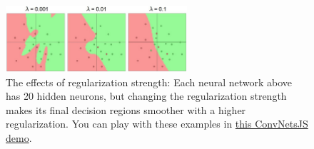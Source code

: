 \begin{figure}[h]
  \centering
  \includegraphics[width=0.6\textwidth]{Images/nn/4.jpeg}
  \caption{The effects of regularization strength: Each neural network above has 20 hidden neurons, but changing the regularization strength makes its final decision regions smoother with a higher regularization. You can play with these examples in \href{http://cs.stanford.edu/people/karpathy/convnetjs/demo/classify2d.html}{this ConvNetsJS demo}.}
    \label{fig:nn_reg}
\end{figure}